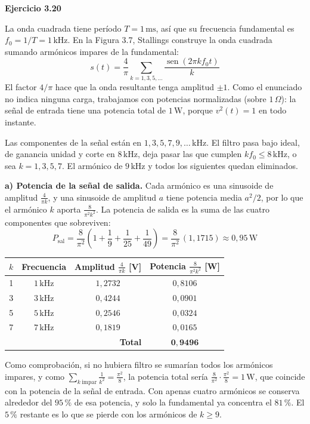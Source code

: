 \documentclass[11pt,a4paper]{article}
\newcommand{\sen}{\operatorname{sen}}
\begin{document}
\vspace{0.3cm}
\noindent\textbf{Ejercicio 3.20}\par
La onda cuadrada tiene período $T=1\,\mathrm{ms}$, así que su frecuencia fundamental es $f_0=1/T=1\,\mathrm{kHz}$. En la Figura 3.7, Stallings construye la onda cuadrada sumando armónicos impares de la fundamental:
\[
  s(t)=\frac{4}{\pi}\sum_{k=1,3,5,\dots}\frac{\sen(2\pi k f_0 t)}{k}
\]
El factor $4/\pi$ hace que la onda resultante tenga amplitud $\pm1$. Como el enunciado no indica ninguna carga, trabajamos con potencias normalizadas (sobre $1\,\Omega$): la señal de entrada tiene una potencia total de $1\,\mathrm{W}$, porque $v^2(t)=1$ en todo instante.

Las componentes de la señal están en $1,3,5,7,9,\dots\,\mathrm{kHz}$. El filtro pasa bajo ideal, de ganancia unidad y corte en $8\,\mathrm{kHz}$, deja pasar las que cumplen $kf_0\le8\,\mathrm{kHz}$, o sea $k=1,3,5,7$. El armónico de $9\,\mathrm{kHz}$ y todos los siguientes quedan eliminados.

\noindent\textbf{a) Potencia de la señal de salida.} Cada armónico es una sinusoide de amplitud $\frac{4}{\pi k}$, y una sinusoide de amplitud $a$ tiene potencia media $a^2/2$, por lo que el armónico $k$ aporta $\frac{8}{\pi^2k^2}$. La potencia de salida es la suma de las cuatro componentes que sobreviven:
\[
  P_{\mathrm{sal}}=\frac{8}{\pi^2}\left(1+\frac{1}{9}+\frac{1}{25}+\frac{1}{49}\right)
  =\frac{8}{\pi^2}\,(1{,}1715)\approx\boxed{0{,}95\,\mathrm{W}}
\]
\begin{center}
\begin{tabular}{|c|c|c|c|}
\hline
\textbf{$k$} & \textbf{Frecuencia} & \textbf{Amplitud $\frac{4}{\pi k}$ [V]} & \textbf{Potencia $\frac{8}{\pi^2k^2}$ [W]} \\
\hline
1 & $1\,\mathrm{kHz}$ & $1{,}2732$ & $0{,}8106$ \\
\hline
3 & $3\,\mathrm{kHz}$ & $0{,}4244$ & $0{,}0901$ \\
\hline
5 & $5\,\mathrm{kHz}$ & $0{,}2546$ & $0{,}0324$ \\
\hline
7 & $7\,\mathrm{kHz}$ & $0{,}1819$ & $0{,}0165$ \\
\hline
\multicolumn{3}{|r|}{\textbf{Total}} & $\mathbf{0{,}9496}$ \\
\hline
\end{tabular}
\end{center}
Como comprobación, si no hubiera filtro se sumarían todos los armónicos impares, y como $\sum_{k\ \mathrm{impar}}\frac{1}{k^2}=\frac{\pi^2}{8}$, la potencia total sería $\frac{8}{\pi^2}\cdot\frac{\pi^2}{8}=1\,\mathrm{W}$, que coincide con la potencia de la señal de entrada. Con apenas cuatro armónicos se conserva alrededor del $95\,\%$ de esa potencia, y solo la fundamental ya concentra el $81\,\%$. El $5\,\%$ restante es lo que se pierde con los armónicos de $k\ge9$.
\end{document}
